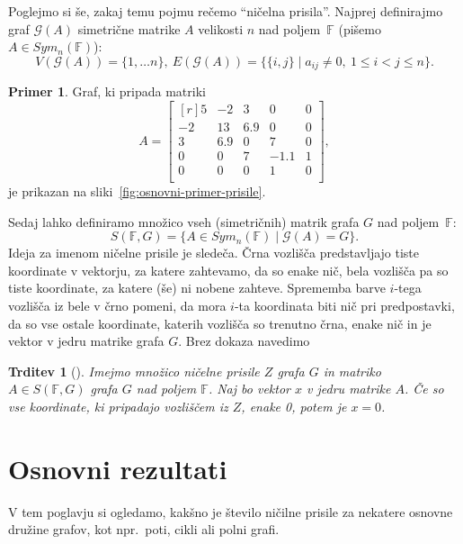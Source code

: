 \documentclass[12pt,a4paper,twoside]{article}
\theoremstyle{definition} %
\newtheorem{primer}[definicija]{Primer}
\theoremstyle{plain} %
\newtheorem{trditev}[definicija]{Trditev}
\numberwithin{equation}{section}  %
\newcommand{\F}{\mathbb F}
\renewcommand{\G}{\mathcal{G}}
\begin{document}
Poglejmo si še, zakaj temu pojmu rečemo ``ničelna prisila''. Najprej definirajmo graf $\G(A)$ simetrične matrike $A$ velikosti $n$ nad poljem~$\F$ (pišemo $A \in Sym_n(\F)$):
\[ V(\G(A)) = \{1, \ldots n\},\ E(\G(A)) = \{\{i,j\} \mid a_{ij} \neq 0,\ 1 \leq i < j \leq n \}. \]
\begin{primer}
    Graf, ki pripada matriki \[ A = \begin{bmatrix*}[r]
    5 & -2 & 3 & 0 & 0 \\
    -2 & 13 & 6.9 & 0 & 0 \\
    3 & 6.9 & 0 & 7 & 0 \\
    0 & 0 & 7 & -1.1 & 1 \\
    0 & 0 & 0 & 1 & 0 \\
    \end{bmatrix*},\] je prikazan na sliki~\ref{fig:osnovni-primer-prisile}.
\end{primer}
Sedaj lahko definiramo množico vseh (simetričnih) matrik grafa $G$ nad poljem~$\F$:
\[ S(\F, G) = \{A \in Sym_n(\F) \mid \G(A) = G \}. \]
Ideja za imenom ničelne prisile je sledeča. Črna vozlišča predstavljajo tiste koordinate v vektorju, za katere zahtevamo, da so enake nič, bela vozlišča pa so tiste koordinate, za katere (še) ni nobene zahteve. Sprememba barve $i$-tega vozlišča iz bele v črno pomeni, da mora $i$-ta koordinata biti nič pri predpostavki, da so vse ostale koordinate, katerih vozlišča so trenutno črna, enake nič in je vektor v jedru matrike grafa $G$. Brez dokaza navedimo
\begin{trditev}[{\cite[trditev 2.3]{aim2008minimumrank}}]
    Imejmo množico ničelne prisile $Z$ grafa $G$ in matriko $A \in S(\F, G)$ grafa $G$ nad poljem $\F$. Naj bo vektor $x$ v jedru matrike $A$. Če so vse koordinate, ki pripadajo vozliščem iz $Z$, enake 0, potem je $x = 0$.
\end{trditev}


\section{Osnovni rezultati}
\label{sec:osnovni-rezultati}

V tem poglavju si ogledamo, kakšno je število ničilne prisile za nekatere osnovne družine grafov, kot npr.~poti, cikli ali polni grafi.
\end{document}
